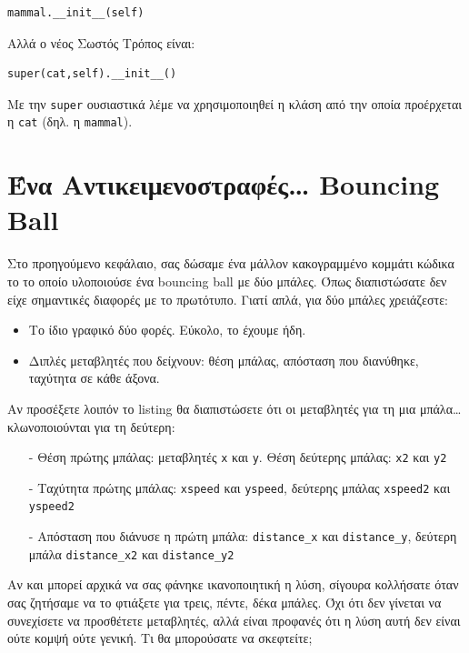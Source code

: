 \begin{verbatim}
mammal.__init__(self)
\end{verbatim}

Αλλά ο νέος Σωστός Τρόπος\texttrademark{} είναι:

\begin{verbatim}
super(cat,self).__init__()
\end{verbatim}

Με την {\tt super} ουσιαστικά λέμε να χρησιμοποιηθεί η κλάση από την οποία
προέρχεται η {\tt cat} (δηλ. η {\tt mammal}).

\section{Ένα Αντικειμενοστραφές\ldots{} Bouncing Ball}

Στο προηγούμενο κεφάλαιο, σας δώσαμε ένα μάλλον κακογραμμένο κομμάτι κώδικα το
το οποίο υλοποιούσε ένα bouncing ball με δύο μπάλες. Όπως διαπιστώσατε
δεν είχε σημαντικές διαφορές με το πρωτότυπο. Γιατί απλά, για δύο μπάλες
χρειάζεστε:

\begin{itemize}
  \item Το ίδιο γραφικό δύο φορές. Εύκολο, το έχουμε ήδη.
  \item Διπλές μεταβλητές που δείχνουν: θέση μπάλας, απόσταση που διανύθηκε,
      ταχύτητα σε κάθε άξονα.
\end{itemize}

Αν προσέξετε λοιπόν το listing θα διαπιστώσετε ότι οι μεταβλητές για τη
μια μπάλα\ldots{} κλωνοποιούνται για τη δεύτερη:

\begin{itemize}
  \item[-] Θέση πρώτης μπάλας: μεταβλητές {\tt x} και {\tt y}. Θέση δεύτερης μπάλας: {\tt x2} και {\tt y2}
  \item[-] Ταχύτητα πρώτης μπάλας: {\tt xspeed} και {\tt yspeed}, δεύτερης μπάλας {\tt xspeed2} και {\tt yspeed2}
  \item[-] Απόσταση που διάνυσε η πρώτη μπάλα: {\tt distance\_x} και {\tt distance\_y}, δεύτερη μπάλα {\tt distance\_x2} και {\tt distance\_y2}
\end{itemize}

Αν και μπορεί αρχικά να σας φάνηκε ικανοποιητική η λύση, σίγουρα
κολλήσατε όταν σας ζητήσαμε να το φτιάξετε για τρεις, πέντε, δέκα μπάλες.
Όχι ότι δεν γίνεται να συνεχίσετε να προσθέτετε μεταβλητές, αλλά είναι
προφανές ότι η λύση αυτή δεν είναι ούτε κομψή ούτε γενική. Τι θα
μπορούσατε να σκεφτείτε;

